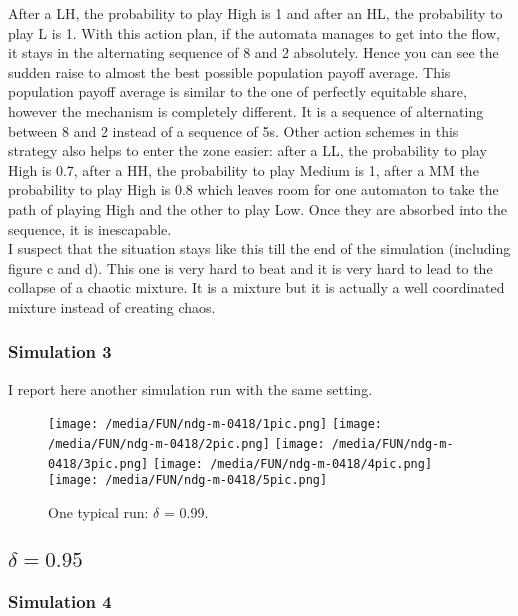 \documentclass[12.5pt]{report}
\begin{document}
After a LH, the probability to play High is 1 and after an HL, the probability to play L is 1. With this action plan, if the automata manages to get into the flow, it stays in the alternating sequence of 8 and 2 absolutely. Hence you can see the sudden raise to almost the best possible population payoff average. This population payoff average is similar to the one of perfectly equitable share, however the mechanism is completely different. It is a sequence of alternating between 8 and 2 instead of a sequence of 5s. Other action schemes in this strategy also helps to enter the zone easier: after a LL, the probability to play High is 0.7, after a HH, the probability to play Medium is 1, after a MM the probability to play High is 0.8 which leaves room for one automaton to take the path of playing High and the other to play Low. Once they are absorbed into the sequence, it is inescapable.\\

I suspect that the situation stays like this till the end of the simulation (including figure c and d). This one is very hard to beat and it is very hard to lead to the collapse of a chaotic mixture. It is a mixture but it is actually a well coordinated mixture instead of creating chaos.\\



\subsubsection{Simulation 3}

I report here another simulation run with the same setting.

\begin{figure}
\texttt{[image: /media/FUN/ndg-m-0418/1pic.png]}
\texttt{[image: /media/FUN/ndg-m-0418/2pic.png]}
\texttt{[image: /media/FUN/ndg-m-0418/3pic.png]}
\texttt{[image: /media/FUN/ndg-m-0418/4pic.png]}
\texttt{[image: /media/FUN/ndg-m-0418/5pic.png]}

\caption{One typical run: $\delta$ = 0.99.}
\end{figure}

\subsection{$\delta = 0.95$}
\subsubsection{Simulation 4}
\end{document}
